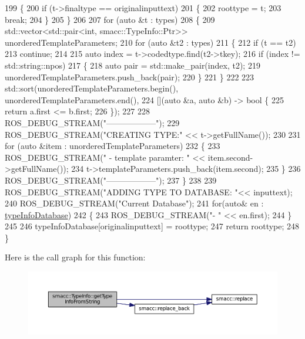 \begin{DoxyCode}
199     \{
200         \textcolor{keywordflow}{if} (t->finaltype == originalinputtext)
201         \{
202             roottype = t;
203             \textcolor{keywordflow}{break};
204         \}
205     \}
206 
207     \textcolor{keywordflow}{for} (\textcolor{keyword}{auto} &t : types)
208     \{
209         std::vector<std::pair<int, smacc::TypeInfo::Ptr>> unorderedTemplateParameters;
210         \textcolor{keywordflow}{for} (\textcolor{keyword}{auto} &t2 : types)
211         \{
212             \textcolor{keywordflow}{if} (t == t2)
213                 \textcolor{keywordflow}{continue};
214 
215             \textcolor{keyword}{auto} index = t->codedtype.find(t2->tkey);
216             \textcolor{keywordflow}{if} (index != std::string::npos)
217             \{
218                 \textcolor{keyword}{auto} pair = std::make\_pair(index, t2);
219                 unorderedTemplateParameters.push\_back(pair);
220             \}
221         \}
222 
223         std::sort(unorderedTemplateParameters.begin(), unorderedTemplateParameters.end(),
224                   [](\textcolor{keyword}{auto} &a, \textcolor{keyword}{auto} &b) -> \textcolor{keywordtype}{bool} \{
225                       \textcolor{keywordflow}{return} a.first <= b.first;
226                   \});
227 
228         ROS\_DEBUG\_STREAM(\textcolor{stringliteral}{"------------------"});
229         ROS\_DEBUG\_STREAM(\textcolor{stringliteral}{"CREATING TYPE:"} << t->getFullName());
230 
231         \textcolor{keywordflow}{for} (\textcolor{keyword}{auto} &item : unorderedTemplateParameters)
232         \{
233             ROS\_DEBUG\_STREAM(\textcolor{stringliteral}{" - template paramter: "} << item.second->getFullName());
234             t->templateParameters.push\_back(item.second);
235         \}
236         ROS\_DEBUG\_STREAM(\textcolor{stringliteral}{"------------------"});
237     \}
238 
239     ROS\_DEBUG\_STREAM(\textcolor{stringliteral}{"ADDING TYPE TO DATABASE: "}<< inputtext);
240     ROS\_DEBUG\_STREAM(\textcolor{stringliteral}{"Current Database"});
241     \textcolor{keywordflow}{for}(\textcolor{keyword}{auto}& en : \hyperlink{classsmacc_1_1TypeInfo_a5dafa5950a93f6cd5b88d5ea573a504c}{typeInfoDatabase})
242     \{
243         ROS\_DEBUG\_STREAM(\textcolor{stringliteral}{"- "} << en.first);
244     \}
245 
246     typeInfoDatabase[originalinputtext] = roottype;
247     \textcolor{keywordflow}{return} roottype;
248 \}
\end{DoxyCode}


Here is the call graph for this function\+:
\nopagebreak
\begin{figure}[H]
\begin{center}
\leavevmode
\includegraphics[width=350pt]{classsmacc_1_1TypeInfo_a9bff1505e37e69b869d686a30c507033_cgraph}
\end{center}
\end{figure}




